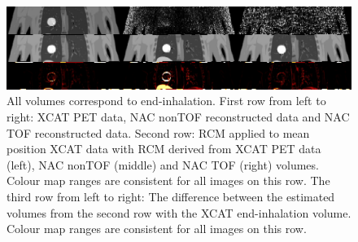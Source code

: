\documentclass[portrait,color=UCLburgundy,margin=2cm]{uclposter}
\begin{document}
\begin{figure}[b]
    \centering
    \includegraphics[width=1\linewidth]{output_flipped.png}
    \caption{All volumes correspond to end-inhalation. First row from left to right: XCAT PET data, NAC nonTOF reconstructed data and NAC TOF reconstructed data. Second row: RCM applied to mean position XCAT data with RCM derived from XCAT PET data (left), NAC nonTOF (middle) and NAC TOF (right) volumes. Colour map ranges are consistent for all images on this row. The third row from left to right: The difference between the estimated volumes from the second row with the XCAT end-inhalation volume. Colour map ranges are consistent for all images on this row.}
    \label{fig:output}
\end{figure}
\end{document}
